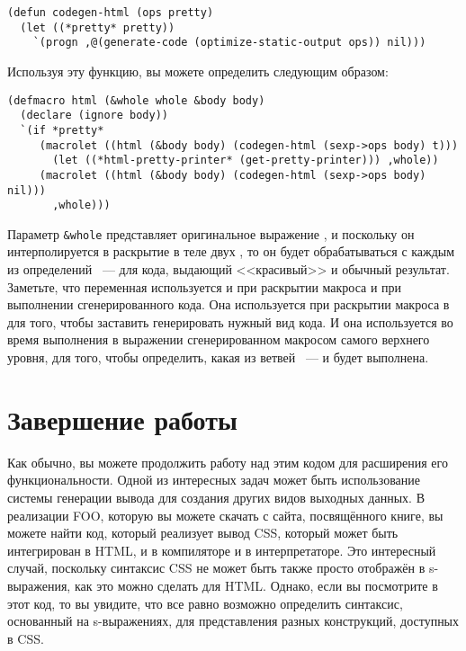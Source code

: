 \begin{lstlisting}
(defun codegen-html (ops pretty)
  (let ((*pretty* pretty))
    `(progn ,@(generate-code (optimize-static-output ops)) nil)))
\end{lstlisting}

Используя эту функцию, вы можете определить  следующим образом:

\begin{lstlisting}
(defmacro html (&whole whole &body body)
  (declare (ignore body))
  `(if *pretty*
     (macrolet ((html (&body body) (codegen-html (sexp->ops body) t)))
       (let ((*html-pretty-printer* (get-pretty-printer))) ,whole))
     (macrolet ((html (&body body) (codegen-html (sexp->ops body) nil)))
       ,whole)))
\end{lstlisting}

Параметр \lstinline!&whole! представляет оригинальное выражение , и поскольку
он интерполируется в раскрытие в теле двух , то он будет обрабатываться с
каждым из определений ~--- для кода, выдающий <<красивый>> и обычный результат.
Заметьте, что переменная  используется и при раскрытии макроса и при
выполнении сгенерированного кода.  Она используется при раскрытии макроса в
 для того, чтобы заставить  генерировать нужный вид
кода.  И она используется во время выполнения в выражении  сгенерированном
макросом  самого верхнего уровня, для того, чтобы определить, какая из ветвей
~---  и  будет выполнена.

\section{Завершение работы}

Как обычно, вы можете продолжить работу над этим кодом для расширения его
функциональности.  Одной из интересных задач может быть использование системы генерации
вывода для создания других видов выходных данных.  В реализации FOO, которую вы можете
скачать с сайта, посвящённого книге, вы можете найти код, который реализует вывод CSS,
который может быть интегрирован в HTML, и в компиляторе и в интерпретаторе.  Это
интересный случай, поскольку синтаксис CSS не может быть также просто отображён в
s-выражения, как это можно сделать для HTML.  Однако, если вы посмотрите в этот код, то вы
увидите, что все равно возможно определить синтаксис, основанный на s-выражениях, для
представления разных конструкций, доступных в CSS.

